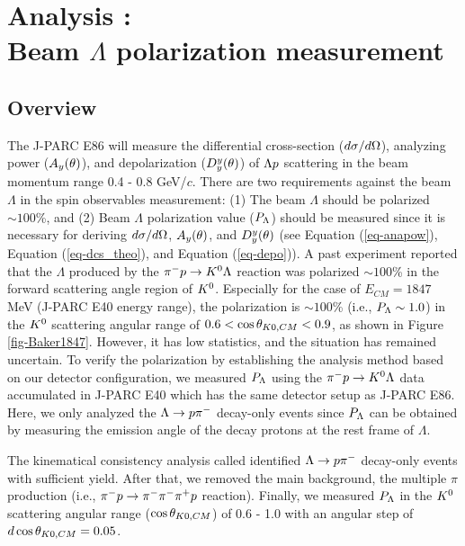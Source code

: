 %
\graphicspath{{./pictures/chapter_Pl/}}

\chapter{Analysis : \\Beam $\Lambda$ polarization measurement} 
\label{chap-Pl}

\section{Overview}

The J-PARC E86 will measure the differential cross-section ($d\sigma/d\Omega$), analyzing power ($A_{y}(\theta)$), and depolarization ($D^{y}_{y}(\theta)$) of $\Lambda p$ scattering in the beam momentum range 0.4 - 0.8 GeV/$c$. There are two requirements against the beam $\Lambda$ in the spin observables measurement: (1) The beam $\Lambda$ should be polarized $\sim100$\%, and (2) Beam $\Lambda$ polarization value ($P_{\Lambda}$) should be measured since it is necessary for deriving $d\sigma/d\Omega$, $A_{y}(\theta)$, and $D^{y}_{y}(\theta)$ (see Equation (\ref{eq-anapow}), Equation (\ref{eq-dcs_theo}), and Equation (\ref{eq-depo})). A past experiment \cite{Baker} reported that the $\Lambda$ produced by the $\pi^- p \to K^0 \Lambda$ reaction was polarized $\sim100$\% in the forward scattering angle region of $K^{0}$. Especially for the case of $E_{CM}=1847$ MeV (J-PARC E40 energy range), the polarization is $\sim100$\% (i.e., $P_{\Lambda}\sim1.0$) in the $K^{0}$ scattering angular range of $0.6<\cos{\theta_{K0,CM}}<0.9$, as shown in Figure \ref{fig-Baker1847}. However, it has low statistics, and the situation has remained uncertain. To verify the polarization by establishing the analysis method based on our detector configuration, we measured $P_{\Lambda}$ using the $\pi^- p \to K^0 \Lambda$ data accumulated in J-PARC E40 which has the same detector setup as J-PARC E86. Here, we only analyzed the $\Lambda\to p\pi^{-}$ decay-only events since $P_{\Lambda}$ can be obtained by measuring the emission angle of the decay protons at the rest frame of $\Lambda$.

The kinematical consistency analysis called  identified $\Lambda\to p\pi^{-}$ decay-only events with sufficient yield. After that, we removed the main background, the multiple $\pi$ production (i.e., $\pi^- p \to \pi^-\pi^-\pi^+p$ reaction). Finally, we measured $P_{\Lambda}$ in the $K^{0}$ scattering angular range ($\cos{\theta_{K0,CM}}$) of 0.6 - 1.0 with an angular step of $d\cos{\theta_{K0,CM}}=0.05$. %

